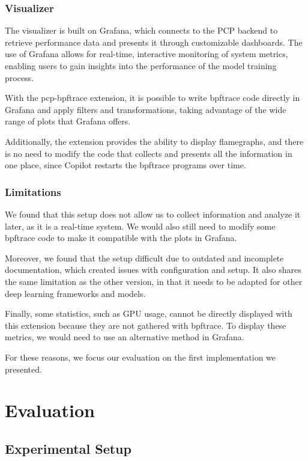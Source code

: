 \documentclass[conference]{IEEEtran}
\begin{document}
\subsubsection{Visualizer}

The visualizer is built on Grafana, which connects to the PCP backend to retrieve performance data and presents it through customizable dashboards.
The use of Grafana allows for real-time, interactive monitoring of system metrics, enabling users to gain insights into the performance of the model training process.

With the pcp-bpftrace extension, it is possible to write bpftrace code directly in Grafana and apply filters and transformations, taking advantage of the wide range of plots that Grafana offers.

Additionally, the extension provides the ability to display flamegraphs, and there is no need to modify the code that collects and presents all the information in one place, since Copilot restarts the bpftrace programs over time.

\subsubsection{Limitations}

We found that this setup does not allow us to collect information and analyze it later, as it is a real-time system.
We would also still need to modify some bpftrace code to make it compatible with the plots in Grafana.

Moreover, we found that the setup difficult due to outdated and incomplete documentation, which created issues with configuration and setup.
It also shares the same limitation as the other version, in that it needs to be adapted for other deep learning frameworks and models.

Finally, some statistics, such as GPU usage, cannot be directly displayed with this extension because they are not gathered with bpftrace. To display these metrics, we would need to use an alternative method in Grafana.

For these reasons, we focus our evaluation on the first implementation we presented.

\section{Evaluation}

\subsection{Experimental Setup}
\end{document}
